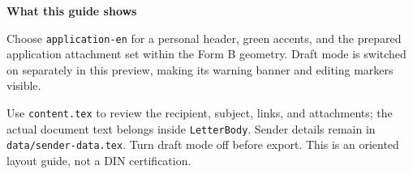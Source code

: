

\DraftModetrue


\begin{LetterBody}

\textbf{What this guide shows}

Choose \texttt{application-en} for a personal header, green accents, and the prepared application attachment set within the Form B geometry. Draft mode is switched on separately in this preview, making its warning banner and editing markers visible.




Use \texttt{content.tex} to review the recipient, subject, links, and attachments; the actual document text belongs inside \texttt{LetterBody}. Sender details remain in \texttt{data/sender-data.tex}. Turn draft mode off before export. This is an oriented layout guide, not a DIN certification.

\end{LetterBody}

